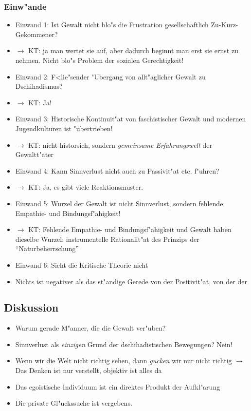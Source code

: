 \documentclass[emulatestandardclasses]{scrartcl}
\begin{document}
\subsubsection{Einw"ande}

\begin{itemize}
  \item Einwand 1: Ist Gewalt nicht blo"s die Frustration gesellschaftlich Zu-Kurz-Gekommener?
  \item $\rightarrow$ KT: ja man wertet sie auf, aber dadurch beginnt man erst sie ernst zu nehmen. Nicht blo"s Problem der sozialen Gerechtigkeit!
  \item Einwand 2: F<lie"sender "Ubergang von allt"aglicher Gewalt zu Dschihadismus?
  \item $\rightarrow$ KT: Ja!
  \item Einwand 3: Historische Kontinuit"at von faschistischer Gewalt und modernen Jugendkulturen ist "ubertrieben!
  \item $\rightarrow$ KT: nicht historsich, sondern \emph{gemeinsame Erfahrungswelt} der Gewaltt"ater
  \item Einwand 4: Kann Sinnverlust nicht auch zu Passivit"at etc. f"uhren?
  \item $\rightarrow$ KT: Ja, es gibt viele Reaktionsmuster.
  \item Einwand 5: Wurzel der Gewalt ist nicht Sinnverlust, sondern fehlende Empathie- und Bindungsf"ahigkeit!
  \item $\rightarrow$ KT: Fehlende Empathie- und Bindungsf"ahigkeit und Gewalt haben dieselbe Wurzel: instrumentelle Rationalit"at des Prinzips der "`Naturbeherrschung"'
  \item Einwand 6: Sieht die Kritische Theorie nicht 
  \item Nichts ist negativer als das st"andige Gerede von der Positivit"at, von der der 
\end{itemize}

\subsection{Diskussion}

\begin{itemize}
  \item Warum gerade M"anner, die die Gewalt ver"uben? 
  \item Sinnverlust als \emph{einzigen} Grund der dschihadistischen Bewegungen? Nein!
  \item Wenn wir die Welt nicht richtig sehen, dann \emph{gucken} wir nur nicht richtig $\rightarrow$ Das Denken ist nur verstellt, objektiv ist alles da
  \item Das egoistische Individuum ist ein direktes Produkt der Aufkl"arung
  \item Die private Gl"uckssuche ist vergebens.
\end{itemize}
\end{document}
